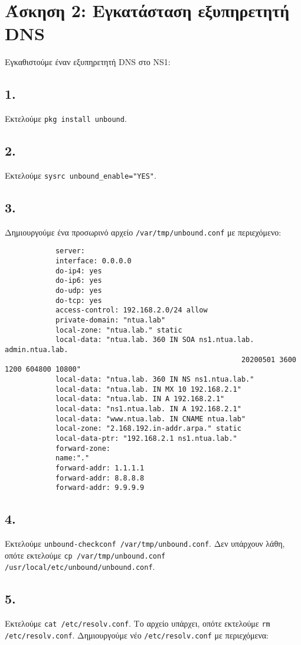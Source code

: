 \documentclass[a4paper, 12pt]{article}
\begin{document}
\section*{Άσκηση 2: Εγκατάσταση εξυπηρετητή DNS}
	
	Εγκαθιστούμε έναν εξυπηρετητή DNS στο NS1:
	
	\subsection*{1.}
		Εκτελούμε \verb|pkg install unbound|.

	\subsection*{2.}
		Εκτελούμε \verb|sysrc unbound_enable="YES"|.

	\subsection*{3.}
		Δημιουργούμε ένα προσωρινό αρχείο \verb|/var/tmp/unbound.conf| με περιεχόμενο: \\
		
		\begin{verbatim}
			server: 
			interface: 0.0.0.0 
			do-ip4: yes 
			do-ip6: yes 
			do-udp: yes 
			do-tcp: yes 
			access-control: 192.168.2.0/24 allow 
			private-domain: "ntua.lab" 
			local-zone: "ntua.lab." static 
			local-data: "ntua.lab. 360 IN SOA ns1.ntua.lab. admin.ntua.lab. 
			                                            20200501 3600 1200 604800 10800" 
			local-data: "ntua.lab. 360 IN NS ns1.ntua.lab." 
			local-data: "ntua.lab. IN MX 10 192.168.2.1" 
			local-data: "ntua.lab. IN A 192.168.2.1" 
			local-data: "ns1.ntua.lab. IN A 192.168.2.1" 
			local-data: "www.ntua.lab. IN CNAME ntua.lab" 
			local-zone: "2.168.192.in-addr.arpa." static 
			local-data-ptr: "192.168.2.1 ns1.ntua.lab." 
			forward-zone: 
			name:"." 
			forward-addr: 1.1.1.1 
			forward-addr: 8.8.8.8 
			forward-addr: 9.9.9.9 
		\end{verbatim}			

	\subsection*{4.}
		Εκτελούμε \verb|unbound-checkconf /var/tmp/unbound.conf|. Δεν υπάρχουν λάθη, οπότε εκτελούμε \verb|cp /var/tmp/unbound.conf /usr/local/etc/unbound/unbound.conf|.

	\subsection*{5.}
		Εκτελούμε \verb|cat /etc/resolv.conf|. Το αρχείο υπάρχει, οπότε εκτελούμε \verb|rm /etc/resolv.conf|. Δημιουργούμε νέο \verb|/etc/resolv.conf| με περιεχόμενα:
		
\end{document}
